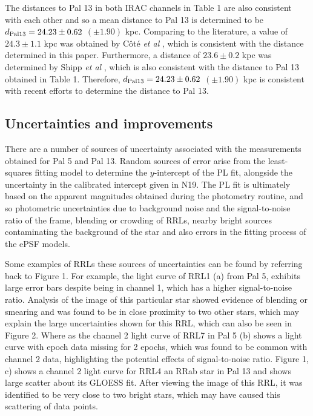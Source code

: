 \documentclass[11pt]{iopart}
\begin{document}
The distances to Pal 13 in both IRAC channels in Table 1 are also consistent with each other and so a mean distance to Pal 13 is determined to be $d_{\rm Pal 13} = 24.23\pm0.62$ $(\pm1.90)$ kpc. Comparing to the literature, a value of $24.3\pm1.1$ kpc was obtained by Côté \textit{et al} \cite{cote2002}, which is consistent with the distance determined in this paper. Furthermore, a distance of $23.6\pm0.2$ kpc was determined by Shipp \textit{et al} \cite{shipp2020}, which is also consistent with the distance to Pal 13 obtained in Table 1. Therefore, $d_{\rm Pal 13} = 24.23\pm0.62$ $(\pm1.90)$ kpc is consistent with recent efforts to determine the distance to Pal 13.

\subsection{Uncertainties and improvements}
There are a number of sources of uncertainty associated with the measurements obtained for Pal 5 and Pal 13. Random sources of error arise from the least-squares fitting model to determine the $y$-intercept of the PL fit, alongside the uncertainty in the calibrated intercept given in N19. The PL fit is ultimately based on the apparent magnitudes obtained during the photometry routine, and so photometric uncertainties due to background noise and the signal-to-noise ratio of the frame, blending or crowding of RRLs, nearby bright sources contaminating the background of the star and also errors in the fitting process of the ePSF models. 

Some examples of RRLs these sources of uncertainties can be found by referring back to Figure 1. For example, the light curve of RRL1 (a) from Pal 5, exhibits large error bars despite being in channel 1, which has a higher signal-to-noise ratio. Analysis of the image of this particular star showed evidence of blending or smearing and was found to be in close proximity to two other stars, which may explain the large uncertainties shown for this RRL, which can also be seen in Figure 2. Where as the channel 2 light curve of RRL7 in Pal 5 (b) shows a light curve with epoch data missing for 2 epochs, which was found to be common with channel 2 data, highlighting the potential effects of signal-to-noise ratio. Figure 1, c) shows a channel 2 light curve for RRL4 an RRab star in Pal 13 and shows large scatter about its GLOESS fit. After viewing the image of this RRL, it was identified to be very close to two bright stars, which may have caused this scattering of data points.
\end{document}

